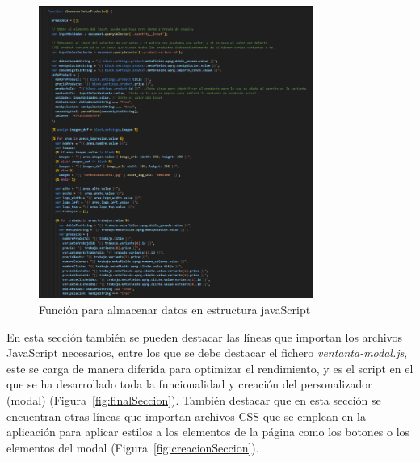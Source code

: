 \documentclass[12pt]{article}
\begin{document}
\begin{figure}[ht]
    \centering
    \includegraphics[width=0.8\textwidth]{imagenesUS3-section/funcionAlmacenarDatosProductos.png}
    \caption{\label{fig:cargardatos} Función para almacenar datos en estructura javaScript}
    \vspace{\fill}
\end{figure}

En esta sección también se pueden destacar las líneas que importan los archivos JavaScript necesarios, entre los que se debe destacar
el fichero \textit{ventanta-modal.js}, este se carga de manera diferida para optimizar el rendimiento, y es el script en el que se ha desarrollado toda la funcionalidad y creación del
personalizador (modal) (Figura~\ref{fig:finalSeccion}). También destacar que en esta sección se encuentran otras líneas que importan archivos CSS que se emplean en la aplicación para aplicar estilos 
a los elementos de la página como los botones o los elementos del modal (Figura~\ref{fig:creacionSeccion}).
\end{document}
